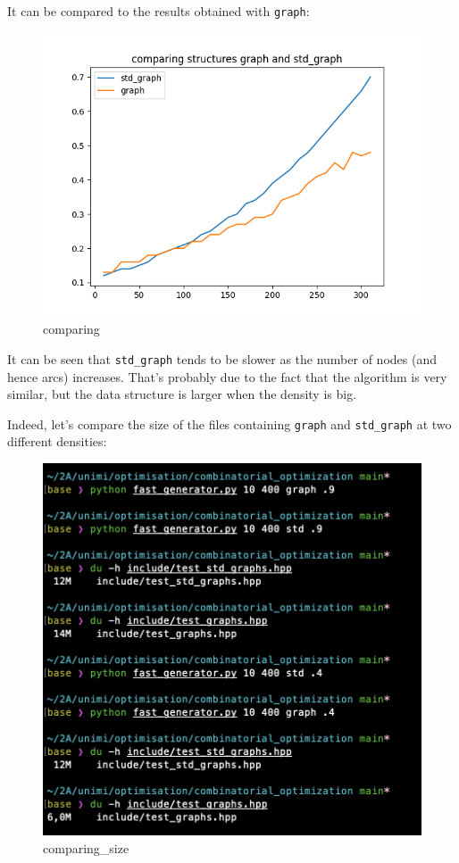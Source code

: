 \documentclass{article}
\begin{document}
It can be compared to the results obtained with \texttt{graph}:

\begin{figure}
\centering
\includegraphics{ressources/comparing_graph__std_graph.png}
\caption{comparing}
\end{figure}

It can be seen that \texttt{std\_graph} tends to be slower as the number
of nodes (and hence arcs) increases. That's probably due to the fact
that the algorithm is very similar, but the data structure is larger
when the density is big.

Indeed, let's compare the size of the files containing \texttt{graph}
and \texttt{std\_graph} at two different densities:

\begin{figure}
\centering
\includegraphics{ressources/spatial_comp.png}
\caption{comparing\_size}
\end{figure}
\end{document}
